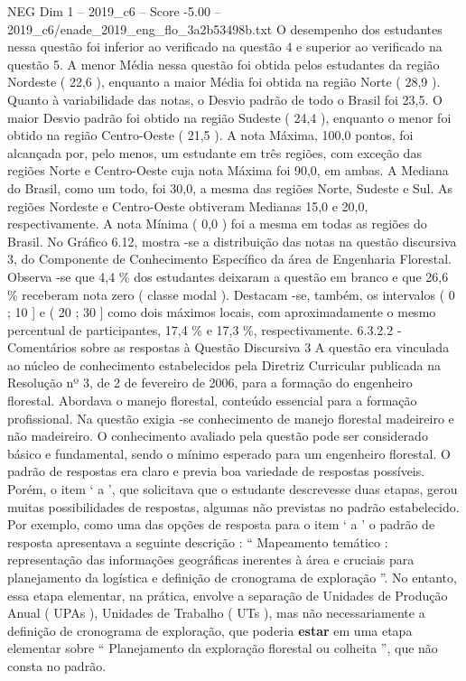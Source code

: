 \begin{textsample}{NEG Dim 1 – 2019\_c6 – Score -5.00 – 2019\_c6/enade\_2019\_eng\_flo\_3a2b53498b.txt}
O desempenho dos estudantes nessa questão foi inferior ao verificado na questão 4 e superior ao verificado na questão 5.
A menor Média nessa questão foi obtida pelos estudantes da região Nordeste ( 22,6 ), enquanto a maior Média foi obtida na região Norte ( 28,9 ).
Quanto à variabilidade das notas, o Desvio padrão de todo o Brasil foi 23,5.
O maior Desvio padrão foi obtido na região Sudeste ( 24,4 ), enquanto o menor foi obtido na região Centro-Oeste ( 21,5 ).
A nota Máxima, 100,0 pontos, foi alcançada por, pelo menos, um estudante em três regiões, com exceção das regiões Norte e Centro-Oeste cuja nota Máxima foi 90,0, em ambas.
A Mediana do Brasil, como um todo, foi 30,0, a mesma das regiões Norte, Sudeste e Sul.
As regiões Nordeste e Centro-Oeste obtiveram Medianas 15,0 e 20,0, respectivamente.
A nota Mínima ( 0,0 ) foi a mesma em todas as regiões do Brasil.
No Gráfico 6.12, mostra -se a distribuição das notas na questão discursiva 3, do Componente de Conhecimento Específico da área de Engenharia Florestal.
Observa -se que 4,4 \% dos estudantes deixaram a questão em branco e que 26,6 \% receberam nota zero ( classe modal ).
Destacam -se, também, os intervalos ( 0 ; 10 ] e ( 20 ; 30 ] como dois máximos locais, com aproximadamente o mesmo percentual de participantes, 17,4 \% e 17,3 \%, respectivamente. 6.3.2.2 - Comentários sobre as respostas à Questão Discursiva 3 A questão era vinculada ao núcleo de conhecimento estabelecidos pela Diretriz Curricular publicada na Resolução nº 3, de 2 de fevereiro de 2006, para a formação do engenheiro florestal.
Abordava o manejo florestal, conteúdo essencial para a formação profissional.
Na questão exigia -se conhecimento de manejo florestal madeireiro e não madeireiro.
O conhecimento avaliado pela questão pode ser considerado básico e fundamental, sendo o mínimo esperado para um engenheiro florestal.
O padrão de respostas era claro e previa boa variedade de respostas possíveis.
Porém, o item ‘ a ’, que solicitava que o estudante descrevesse duas etapas, gerou muitas possibilidades de respostas, algumas não previstas no padrão estabelecido.
Por exemplo, como uma das opções de resposta para o item ‘ a ’ o padrão de resposta apresentava a seguinte descrição : “ Mapeamento temático : representação das informações geográficas inerentes à área e cruciais para planejamento da logística e definição de cronograma de exploração ”.
No entanto, essa etapa elementar, na prática, envolve a separação de Unidades de Produção Anual ( UPAs ), Unidades de Trabalho ( UTs ), mas não necessariamente a definição de cronograma de exploração, que poderia \textbf{estar} em uma etapa elementar sobre “ Planejamento da exploração florestal ou colheita ”, que não consta no padrão.

\end{textsample}
